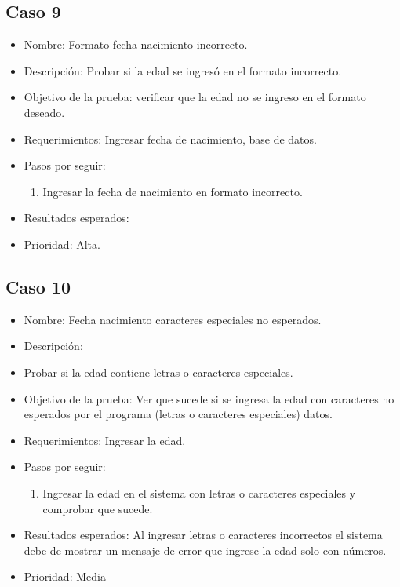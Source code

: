 \documentclass[conference]{IEEEtran}
\begin{document}
\subsection{Caso 9}
\begin{itemize}
\item Nombre: Formato fecha nacimiento incorrecto. 
\item Descripción: Probar si la edad se ingresó en el formato incorrecto.
\item Objetivo de la prueba: verificar que la edad no se ingreso en el formato deseado. 
\item Requerimientos: Ingresar fecha de nacimiento, base de datos. 
\item Pasos por seguir: 
\begin{enumerate}
\item Ingresar la fecha de nacimiento en formato incorrecto.
\end{enumerate}
\item Resultados esperados: 
\item Prioridad: Alta.
\end{itemize}

\subsection{Caso 10}
\begin{itemize}
\item Nombre: Fecha nacimiento caracteres especiales no esperados.
\item Descripción: \item Probar si la edad contiene letras o caracteres especiales.
\item Objetivo de la prueba: Ver que sucede si se ingresa la edad con caracteres no esperados por el programa (letras o caracteres especiales) datos.
\item Requerimientos: Ingresar la edad. 
\item Pasos por seguir: 
\begin{enumerate}
\item Ingresar la edad en el sistema con letras o caracteres especiales y comprobar que sucede.
\end{enumerate}
\item Resultados esperados: Al ingresar letras o caracteres incorrectos el sistema debe de mostrar un mensaje de error que ingrese la edad solo con números.
\item Prioridad: Media
\end{itemize}
\end{document}
